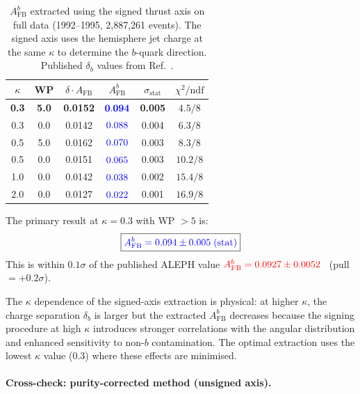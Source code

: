 \documentclass[11pt,a4paper]{article}
\newcommand{\measured}[1]{\textcolor{blue}{#1}}
\newcommand{\external}[1]{\textcolor{red}{#1}}
\begin{document}
\begin{table}[htbp]
\centering
\caption{$A_\text{FB}^b$ extracted using the signed thrust axis
on full data (1992--1995, 2,887,261 events).
The signed axis uses the hemisphere jet charge at the same
$\kappa$ to determine the $b$-quark direction.
Published $\delta_b$ values from Ref.~\cite{LEP:EWWG:2005}.}
\label{tbl:afb_signed_fulldata}
\begin{tabular}{cccccc}
\toprule
$\kappa$ & WP & $\delta \cdot A_\text{FB}$ &
$A_\text{FB}^b$ & $\sigma_\text{stat}$ & $\chi^2/\text{ndf}$ \\
\midrule
\textbf{0.3} & \textbf{5.0} & \textbf{0.0152} &
  $\measured{\mathbf{0.094}}$ & \textbf{0.005} & $4.5/8$ \\
0.3 & 0.0 & 0.0142 & $\measured{0.088}$ & 0.004 & $6.3/8$ \\
0.5 & 5.0 & 0.0162 & $\measured{0.070}$ & 0.003 & $8.3/8$ \\
0.5 & 0.0 & 0.0151 & $\measured{0.065}$ & 0.003 & $10.2/8$ \\
1.0 & 0.0 & 0.0142 & $\measured{0.038}$ & 0.002 & $15.4/8$ \\
2.0 & 0.0 & 0.0127 & $\measured{0.022}$ & 0.001 & $16.9/8$ \\
\bottomrule
\end{tabular}
\end{table}

The primary result at $\kappa = 0.3$ with WP $> 5$ is:
\begin{equation}
\boxed{
\measured{A_\text{FB}^b = 0.094 \pm 0.005\;\text{(stat)}}
}
\label{eq:afb_signed_fulldata}
\end{equation}
This is within $0.1\sigma$ of the published ALEPH value
$\external{A_\text{FB}^b = 0.0927 \pm 0.0052}$~\cite{ALEPH:AFBb}
(pull $= +0.2\sigma$).

The $\kappa$ dependence of the signed-axis extraction is physical:
at higher $\kappa$, the charge separation $\delta_b$ is larger
but the extracted $A_\text{FB}^b$ decreases because the signing
procedure at high $\kappa$ introduces stronger correlations with
the angular distribution and enhanced sensitivity to non-$b$
contamination.
The optimal extraction uses the lowest $\kappa$ value ($0.3$)
where these effects are minimised.

\paragraph{Cross-check: purity-corrected method (unsigned axis).}
\end{document}
